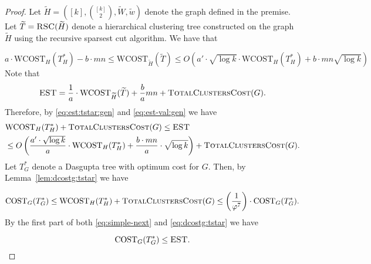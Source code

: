\documentclass[letterpaper,11pt]{article}
\newcommand{\CT}{\text{COST}}
\newcommand{\wCT}{\text{WCOST}}
\newcommand{\estg}{\textsc{EST}}
\newcommand{\estgen}{\frac{1}{a} \cdot \wCT_{\wt{H}}(\wt{T}) + \frac{b}{a} mn + \textsc{TotalClustersCost}(G)}
\theoremstyle{plain}
\theoremstyle{definition}
\theoremstyle{remark}
\newcommand{\wt}[1]{\widetilde{#1}}
\begin{document}
\begin{proof}
	Let $\widetilde{H}= \left([k], {[k] \choose 2}, \widetilde{W}, \widetilde{w}\right)$
	denote the graph defined in the premise. Let $\widetilde{T} = \textsc{RSC}(\widetilde{H})$ 
	denote a hierarchical clustering tree constructed on the graph $\widetilde{H}$ using the recursive 
	sparsest cut algorithm. We have that

	\begin{equation}
		\label{eq:est:tstar:gen}
		a \cdot \wCT_{H}(T^*_{H}) - b\cdot mn   \leq \wCT_{\wt{H}}(\widetilde{T}) \leq O\left(a' \cdot \sqrt{\log k} \cdot \wCT_{H}(T^*_{H}) + b\cdot mn \sqrt{\log k} \right)
	\end{equation}
	Note that
	\begin{equation}
		\label{eq:est-val:gen}
		\estg = \estgen \text{.}
	\end{equation}
Therefore, by \eqref{eq:est:tstar:gen} and \eqref{eq:est-val:gen} we have
	\begin{align}
	\label{eq:simple-next}
		&\wCT_{H}(T^*_{H})+ \textsc{TotalClustersCost}(G)  \leq \estg  \nonumber\\
		&\leq O\left(\frac{a' \cdot \sqrt{\log k}}{a} \cdot \wCT_{H}(T^*_{H}) + \frac{b\cdot mn}{a} \cdot \sqrt{\log k}  \right) + \textsc{TotalClustersCost}(G). 
	\end{align}
Let $T^*_G$ denote a Dasgupta tree with optimum cost for $G$. Then, by Lemma~\ref{lem:dcostg:tstar} we have

	\begin{equation} \label{eq:dcostg:tstar}
		\CT_G(T^*_G) \leq \wCT_{H}(T^*_{H})+ \textsc{TotalClustersCost}(G) \leq \left(\frac{1}{\varphi^{7}}\right)\cdot \CT_G(T^*_G).
	\end{equation}
	By the first part of both \eqref{eq:simple-next} and \eqref{eq:dcostg:tstar} we have
	
	\begin{equation}
		\label{eq:t*g-min}
		\CT_G(T^*_G) \leq  \estg. 
	\end{equation}


\end{proof}
\end{document}
